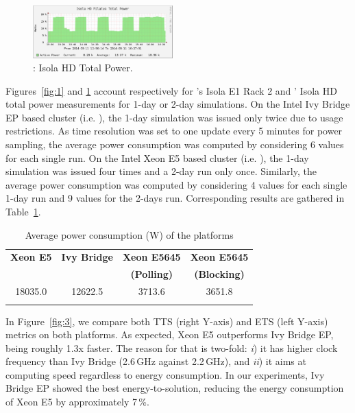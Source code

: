 \begin{figure}[htbf]
  \begin{center}
    \includegraphics[width=0.48\textwidth]{Figs/NRJ_benchmark_Pilatus.eps}
    \caption{\pilat: Isola HD Total Power.}
    \label{fig:2}
  \end{center}
\end{figure}

Figures~\ref{fig:1}   and   \ref{fig:2}   account   respectively   for
\monch's Isola E1 Rack  2 and \pilat' Isola HD total
power measurements for  1-day or 2-day simulations. On  the Intel Ivy
Bridge EP  based cluster (i.e.  \monch),  the 1-day simulation
was issued  only twice due  to usage restrictions. As  time resolution
was set to one update every  5 minutes for power sampling, the average
power consumption was computed by considering 6 values for each single
run.  On the Intel Xeon E5 based cluster (i.e.  \pilat), the
1-day simulation  was issued  four times and  a 2-day run  only once.
Similarly, the average power consumption was computed by considering 4
values  for  each  single  1-day  run  and 9  values  for  the  2-days
run. Corresponding results are gathered in Table~\ref{tab:3}.

\begin{table}[htbf]
  \begin{center}
    \caption{Average power consumption (W) of the platforms}
    \label{tab:3}
    \begin{tabular}{cccc}
      \hline\noalign{\smallskip}
      \textbf{\scriptsize{Xeon E5}} & \textbf{\scriptsize{Ivy Bridge}} & \textbf{\scriptsize{Xeon  E5645}} & \textbf{\scriptsize{Xeon  E5645}}\\
      & & \textbf{\scriptsize{(Polling)}} & \textbf{\scriptsize{(Blocking)}} \\
      \noalign{\smallskip}\hline\noalign{\smallskip}
      18035.0 & 12622.5 & 3713.6 & 3651.8 \\ 
      \noalign{\smallskip}\hline
    \end{tabular}
  \end{center}
\end{table}

In  Figure~\ref{fig:3}, we  compare both  TTS (right  Y-axis)  and ETS
(left  Y-axis)  metrics  on  both  platforms.  As  expected,  Xeon  E5
outperforms Ivy Bridge EP, being  roughly 1.3x faster.  The reason for
that is  two-fold: \emph{i}) it has  higher clock frequency  than Ivy Bridge
(2.6\,GHz  against  2.2\,GHz),  and  \emph{ii})  it  aims at  computing  speed
regardless to  energy consumption.  In our experiments,  Ivy Bridge EP
showed the best energy-to-solution, reducing the energy consumption of
Xeon E5 by approximately 7\,\%.

